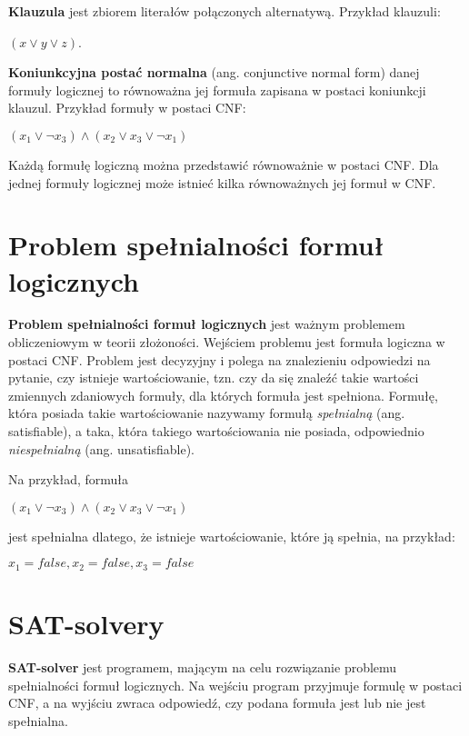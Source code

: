 \documentclass[a4paper,12pt]{book}
\theoremstyle{definition}
\begin{document}
\textbf{Klauzula} jest zbiorem literałów połączonych alternatywą. Przykład klauzuli:

\begin{center}
    $(x \lor y \lor z)$. 
\end{center}

\textbf{Koniunkcyjna postać normalna} (ang. conjunctive normal form) danej formuły logicznej to równoważna jej formuła zapisana w postaci koniunkcji klauzul. Przykład formuły w postaci CNF:

\begin{center}
    $(x_1 \lor \neg x_3) \land (x_2 \lor x_3 \lor \neg x_1)$
\end{center}

Każdą formułę logiczną można przedstawić równoważnie w postaci CNF. Dla jednej formuły logicznej może istnieć kilka równoważnych jej formuł w CNF.  

\section{Problem spełnialności formuł logicznych}

\textbf{Problem spełnialności formuł logicznych} jest ważnym problemem obliczeniowym w teorii złożoności. Wejściem problemu jest formuła logiczna w postaci CNF. Problem jest decyzyjny i polega na znalezieniu odpowiedzi na pytanie, czy istnieje wartościowanie, tzn. czy da się znaleźć takie wartości zmiennych zdaniowych formuły, dla których formuła jest spełniona. Formułę, która posiada takie wartościowanie nazywamy formułą \textit{spełnialną} (ang. satisfiable), a taka, która takiego wartościowania nie posiada, odpowiednio \textit{niespełnialną} (ang. unsatisfiable).

Na przykład, formuła
\begin{center}
    $(x_1 \lor \neg x_3) \land (x_2 \lor x_3 \lor \neg x_1)$
\end{center}

jest spełnialna dlatego, że istnieje wartościowanie, które ją spełnia, na przykład:
\begin{center}
    $x_1 = false, x_2 = false, x_3 = false$
\end{center}

\section{SAT-solvery}

\textbf{SAT-solver} jest programem, mającym na celu rozwiązanie problemu spełnialności formuł logicznych. Na wejściu program przyjmuje formulę w postaci CNF, a na wyjściu zwraca odpowiedź, czy podana formuła jest lub nie jest spełnialna.
\end{document}
